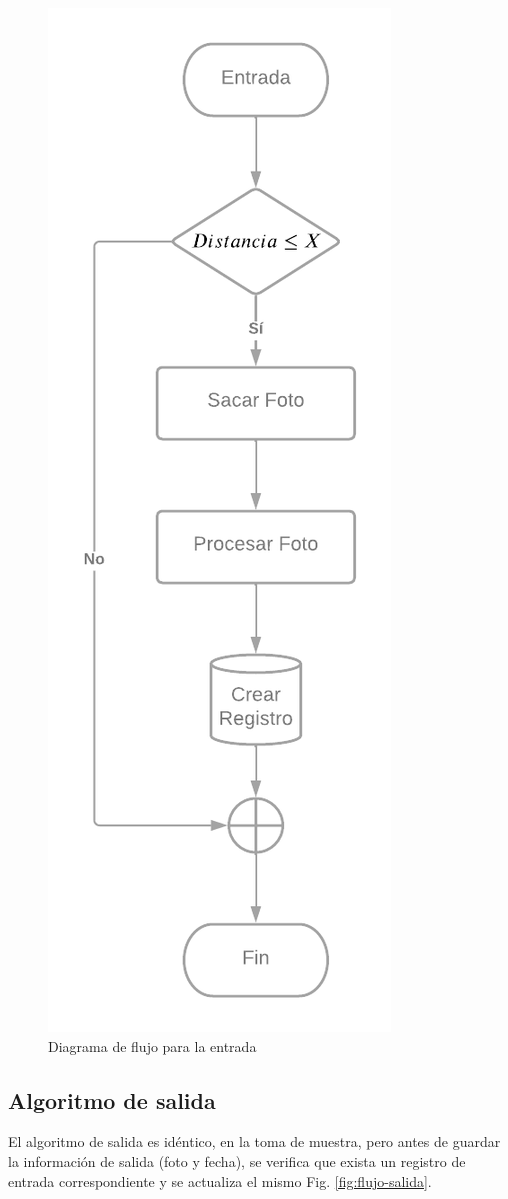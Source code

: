 \begin{figure}
    \centering
    \includegraphics[width=.5\textwidth]{imgs/flujo-entrada.png}
    \caption{Diagrama de flujo para la entrada}
    \label{fig:flujo-entrada}
\end{figure}

\subsection{Algoritmo de salida}

El algoritmo de salida es idéntico, en la toma de muestra, pero antes de guardar la información de salida (foto y fecha), se verifica que exista un registro de entrada correspondiente y se actualiza el mismo Fig. \ref{fig:flujo-salida}.

